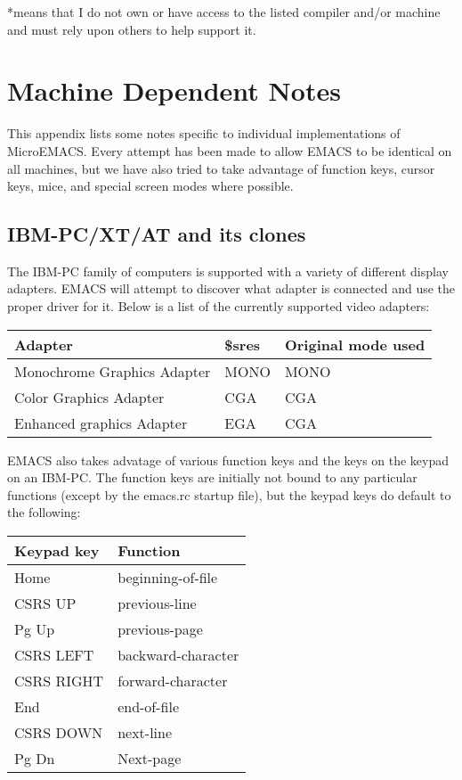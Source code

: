 *means that I do not own or have access to the listed compiler and/or
 machine and must rely upon others to help support it.
\chapter{Machine Dependent Notes}

This appendix lists some notes specific to individual
implementations of MicroEMACS. Every attempt has been made to allow
EMACS to be identical on all machines, but we have also tried to take
advantage of function keys, cursor keys, mice, and special screen modes
where possible.

\section{IBM-PC/XT/AT and its clones}

The IBM-PC family of computers is supported with a variety of
different display adapters.  EMACS will attempt to discover what adapter
is connected and use the proper driver for it.  Below is a list of the
currently supported video adapters:

\begin{tabular}{llp{236pt}}
Adapter & \$sres & Original mode used\\ \hline
Monochrome Graphics Adapter & MONO & MONO\\
Color Graphics Adapter & CGA & CGA\\
Enhanced graphics Adapter & EGA & CGA\\
\end{tabular}

EMACS also takes advatage of various function keys and the keys
on the keypad on an IBM-PC.  The function keys are initially not bound
to any particular functions (except by the emacs.rc startup file), but
the keypad keys do default to the following:

\begin{tabular}{ll}
Keypad key & Function\\ \hline
Home & beginning-of-file\\
CSRS UP & previous-line\\
Pg Up & previous-page\\
CSRS LEFT & backward-character\\
CSRS RIGHT & forward-character\\
End & end-of-file\\
CSRS DOWN & next-line\\
Pg Dn & Next-page\\
\end{tabular}

